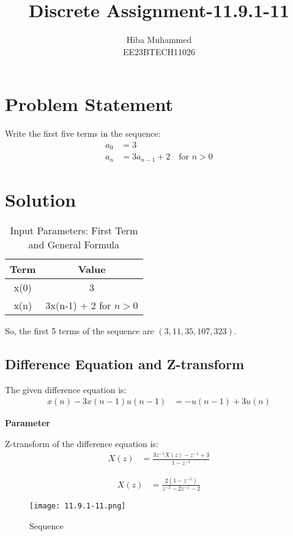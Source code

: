 \documentclass[12pt]{article}
\title{Discrete Assignment-11.9.1-11}
\author{Hiba Muhammed \\
        EE23BTECH11026}
\date{}
\newcommand{\brak}[1]{\left( #1 \right)}
\begin{document}
\maketitle

\section*{Problem Statement}
Write the first five terms in the sequence:
\begin{align}
a_{0}  &= 3 \\
a_{n}  &= 3a_{n-1} + 2 \quad \text{for } n > 0
\end{align}

\section*{Solution}

\begin{table}[h]
  \centering
  \caption{Input Parameters: First Term and General Formula}
  \begin{tabular}{|c|c|}
    \hline
    \textbf{Term} & \textbf{Value} \\
    \hline
    x(0) & 3 \\
    x(n) & 3x(n-1) + 2 for $n > 0$ \\
    \hline
  \end{tabular}
\end{table}

So, the first 5 terms of the sequence are $\brak{3, 11, 35, 107, 323}$.


\subsection*{Difference Equation and Z-transform}

The given difference equation is:
\begin{align}
x(n) - 3x(n-1)u(n-1) &=- u(n-1) + 3u(n)
\end{align}

\textbf{Parameter}

Z-transform of the difference equation is:
\begin{align}
X(z) &= \frac{3z^{-1}X(z) - z^{-1} + 3}{1 - z^{-1}}
\end{align}

\begin{align}
X(z) &= \frac{2(1 - z^{-1})}{z^{-2} - 2z^{-1} - 2}
\end{align}

\begin{figure}[h]
    \centering
    \texttt{[image: 11.9.1-11.png]}
    \caption{Sequence}
\end{figure}
\end{document}
